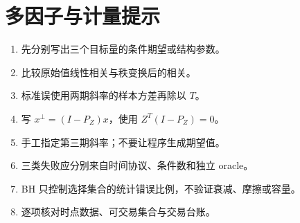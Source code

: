 \chapter{多因子与计量提示}
\begin{enumerate}[leftmargin=*]
  \item 先分别写出三个目标量的条件期望或结构参数。
  \item 比较原始值线性相关与秩变换后的相关。
  \item 标准误使用两期斜率的样本方差再除以 $T$。
  \item 写 $x^\perp=(I-P_Z)x$，使用 $Z^T(I-P_Z)=0$。
  \item 手工指定第三期斜率；不要让程序生成期望值。
  \item 三类失败应分别来自时间协议、条件数和独立 oracle。
  \item BH 只控制选择集合的统计错误比例，不验证衰减、摩擦或容量。
  \item 逐项核对时点数据、可交易集合与交易台账。
\end{enumerate}
